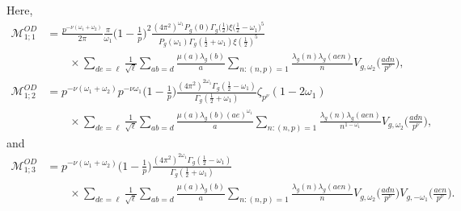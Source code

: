 \documentclass[12pt]{amsart}
\theoremstyle{plain}
\theoremstyle{definition}
\begin{document}
 Here, 
 \begin{align*}
 \mathscr{M}^{OD}_{1;1}&=  \frac{p^{-\nu(\omega_1+\omega_2)}}{2\pi} \frac{\pi}{\omega_1}    \Big(1-\frac{1}{p}\Big)^2
    \frac{(4\pi^2)^{\omega_1}P_g(0) \Gamma_g\big(\frac12\big)  \xi\big(\frac12-\omega_1\big)^5}{P_g(\omega_1) \Gamma_g(\frac12+\omega_1) \xi(\frac12)^5}   \nonumber  \\
    &\hspace{2em}\times
\sum_{de=\ell}
    \frac{1}{\sqrt{\ell}}
    \sum_{ab=d} \frac{\mu(a)  \lambda_g(b)}{a}
    \sum_{n: (n,p)=1}  \frac{\lambda_g(n)  \lambda_g(aen)}{n }
    V_{g, \omega_2} \Big(\frac{adn}{p^\nu }\Big),
    \\
     \mathscr{M}^{OD}_{1;2}
     &= p^{-\nu(\omega_1+\omega_2)}p^{-\nu\omega_1}  \Big(1-\frac{1}{p}\Big)
    \frac{(4\pi^2)^{2\omega_1}\Gamma_g(\frac12-\omega_1)}{\Gamma_g(\frac12+\omega_1) } 
    \zeta_{p^{\nu}}(1-2\omega_1)  \nonumber\\&\hspace{2em}\times
    \sum_{de=\ell}
    \frac{1}{\sqrt{\ell}}
    \sum_{ab=d} \frac{\mu(a)  \lambda_g(b)(ae)^{\omega_1}}{a}
    \sum_{n: (n,p)=1}  \frac{\lambda_g(n)  \lambda_g(aen)}{n^{1-\omega_1} }
    V_{g, \omega_2} \Big(\frac{adn}{p^\nu }\Big),
 \end{align*}
 and 
 \begin{align*}
  \mathscr{M}^{OD}_{1;3}
  &=p^{-\nu(\omega_1+\omega_2)}   \Big(1-\frac1{p}\Big)
    \frac{(4\pi^2)^{2\omega_1} \Gamma_g(\frac12-\omega_1)}{ \Gamma_g(\frac12+\omega_1) } 
 \\
    &\hspace{2em}\times  \sum_{de=\ell}
    \frac{1}{\sqrt{\ell}}
    \sum_{ab=d} \frac{\mu(a)  \lambda_g(b)}{a}
    \sum_{n: (n,p)=1}  \frac{\lambda_g(n)  \lambda_g(aen)}{n }
    V_{g, \omega_2} \Big(\frac{adn}{p^\nu }\Big)   V_{g, -\omega_1}\Big(\frac{aen}{p^\nu}\Big).
 \end{align*}
 
\end{document}
